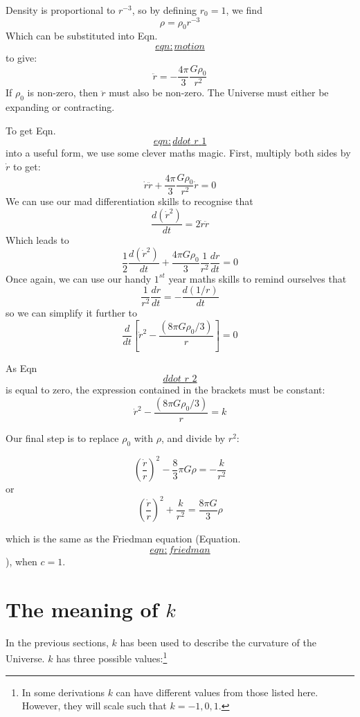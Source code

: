 \documentclass[]{book}
\let\rmarkdownfootnote\footnote%
\def\footnote{\protect\rmarkdownfootnote}
\begin{document}
Density is proportional to \(r^{-3}\), so by defining \(r_{0} = 1\), we find
\[\rho = \rho_{0}r^{-3}\] Which can be substituted into
Eqn.~\protect\hyperlink{eqn:motion}{\[eqn:motion\]} to give: \[\label{eqn:ddot_r_1}
    \ddot{r} = -\dfrac{4\pi}{3}\dfrac{G\rho_0}{r^2}\] If \(\rho_0\) is
non-zero, then \(\ddot{r}\) must also be non-zero. The Universe must
either be expanding or contracting.

To get Eqn.~\protect\hyperlink{eqn:ddot_r_1}{\[eqn:ddot\_r\_1\]} into a useful form, we use some clever maths
magic. First, multiply both sides by \(\dot{r}\) to get:
\[\dot{r}\ddot{r} + \dfrac{4\pi}{3}\dfrac{G\rho_{0}}{r^2}\dot{r} = 0\]
We can use our mad differentiation skills to recognise that
\[\dfrac{d(\dot{r}^2)}{dt} = 2\dot{r}\ddot{r}\] Which leads to
\[\dfrac{1}{2}\dfrac{d(\dot{r}^2)}{dt} + \dfrac{4\pi G \rho_0}{3} \dfrac{1}{r^2}\dfrac{dr}{dt} = 0\]
Once again, we can use our handy \(1^{st}\) year maths skills to remind
ourselves that \[\dfrac{1}{r^2}\dfrac{dr}{dt} = -\dfrac{d(1/r)}{dt}\] so
we can simplify it further to \[\label{ddot_r_2}
    \dfrac{d}{dt}\left[\dot{r}^2 - \dfrac{(8\pi G \rho_0 / 3)}{r}\right] = 0\]

As Eqn~\protect\hyperlink{ddot_r_2}{\[ddot\_r\_2\]} is equal to zero, the expression contained in the
brackets must be constant:
\[\dot{r}^2 - \dfrac{(8\pi G \rho_0 / 3)}{r} = k\]

Our final step is to replace \(\rho_0\) with \(\rho\), and divide by \(r^2\):

\[\left(\dfrac{\dot{r}}{r}\right)^2 - \dfrac{8}{3}\pi G \rho = -\dfrac{k}{r^2}\]
or
\[\left(\dfrac{\dot{r}}{r}\right)^2 + \dfrac{k}{r^2} = \dfrac{8\pi G}{3}\rho\]

which is the same as the Friedman equation
(Equation.~\protect\hyperlink{eqn:friedman}{\[eqn:friedman\]}), when \(c=1\).

\hypertarget{sec:curvature}{%
\section{\texorpdfstring{The meaning of \(k\)}{The meaning of k}}\label{sec:curvature}}

In the previous sections, \(k\) has been used to describe the curvature of
the Universe. \(k\) has three possible values:\footnote{In some derivations \(k\) can have different values from those
  listed here. However, they will scale such that \(k = -1, 0, 1\).}
\end{document}
